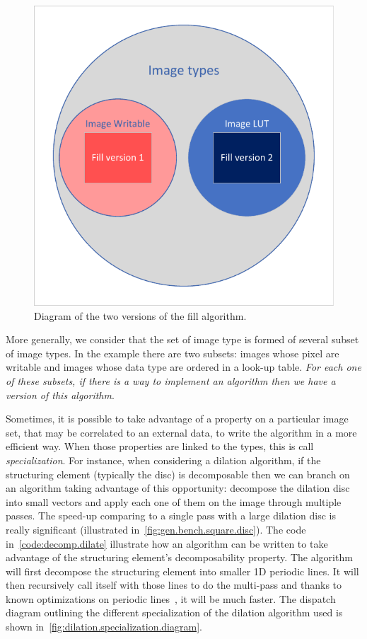 \begin{figure}[tbh]
  \centering
  \includegraphics[width=.5\linewidth]{figs/fill_version_diagram.pdf}
  \caption{Diagram of the two versions of the fill algorithm.}
  \label{fig:fill.version.diagram}
\end{figure}

More generally, we consider that the set of image type is formed of several subset of image types. In the example there
are two subsets: images whose pixel are writable and images whose data type are ordered in a look-up table. \emph{For
  each one of these subsets, if there is a way to implement an algorithm then we have a \emph{version} of this algorithm}.

Sometimes, it is possible to take advantage of a property on a particular image set, that may be correlated to an
external data, to write the algorithm in a more efficient way. When those properties are linked to the types, this is
call \emph{specialization}. For instance, when considering a dilation algorithm, if the structuring element (typically
the disc) is decomposable then we can branch on an algorithm taking advantage of this opportunity: decompose the
dilation disc into small vectors and apply each one of them on the image through multiple passes. The speed-up comparing
to a single pass with a large dilation disc is really significant (illustrated in~\ref{fig:gen.bench.square.disc}). The
code in~\ref{code:decomp.dilate} illustrate how an algorithm can be written to take advantage of the structuring
element's decomposability property. The algorithm will first decompose the structuring element into smaller 1D periodic
lines. It will then recursively call itself with those lines to do the multi-pass and thanks to known optimizations on
periodic lines~\cite{vanherk.1992.localminmax}, it will be much faster. The dispatch diagram outlining the different
specialization of the dilation algorithm used is shown in~\cref{fig:dilation.specialization.diagram}.

